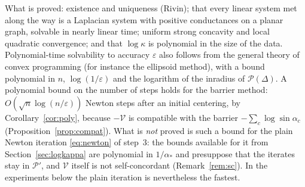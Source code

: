 \documentclass[11pt]{amsart}
\theoremstyle{definition}
\theoremstyle{remark}
\newcommand{\eps}{\varepsilon}
\begin{document}
What is proved: existence and uniqueness (Rivin); that every linear system met along the way is a Laplacian system with positive conductances on a planar graph, solvable in nearly linear time; uniform strong concavity and local quadratic convergence; and that $\log\kappa$ is polynomial in the size of the data.
Polynomial-time solvability to accuracy $\eps$ also follows from the general theory of convex programming (for instance the ellipsoid method), with a bound polynomial in $n$, $\log(1/\eps)$ and the logarithm of the inradius of $\mathcal P(\Delta)$.
A polynomial bound on the number of steps holds for the barrier method: $O(\sqrt n\log(n/\eps))$ Newton steps after an initial centering, by Corollary~\ref{cor:poly}, because $-\mathcal V$ is compatible with the barrier $-\sum_c\log\sin\alpha_c$ (Proposition~\ref{prop:compat}).
What is \emph{not} proved is such a bound for the plain Newton iteration \eqref{eq:newton} of step~3: the bounds available for it from Section~\ref{sec:logkappa} are polynomial in $1/\alpha_*$ and presuppose that the iterates stay in $\mathcal P'$, and $\mathcal V$ itself is not self-concordant (Remark~\ref{rem:sc}).
In the experiments below the plain iteration is nevertheless the fastest.
\end{document}
